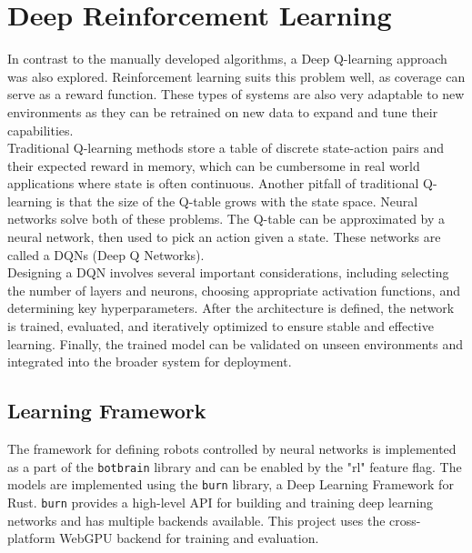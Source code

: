 
\section{Deep Reinforcement Learning}
\label{sec:rl}
In contrast to the manually developed algorithms, a Deep Q-learning approach was also explored. Reinforcement learning suits this problem well, as coverage can serve as a reward function. These types of systems are also very adaptable to new environments as they can be retrained on new data to expand and tune their capabilities. \\

Traditional Q-learning methods store a table of discrete state-action pairs and their expected reward in memory, which can be cumbersome in real world applications where state is often continuous. Another pitfall of traditional Q-learning is that the size of the Q-table grows with the state space. Neural networks solve both of these problems. The Q-table can be approximated by a neural network, then used to pick an action given a state. These networks are called a DQNs (Deep Q Networks). \\

Designing a DQN involves several important considerations, including selecting the number of layers and neurons, choosing appropriate activation functions, and determining key hyperparameters. After the architecture is defined, the network is trained, evaluated, and iteratively optimized to ensure stable and effective learning. Finally, the trained model can be validated on unseen environments and integrated into the broader system for deployment.


\subsection{Learning Framework}
The framework for defining robots controlled by neural networks is implemented as a part of the \texttt{botbrain} library and can be enabled by the "rl" feature flag. The models are implemented using the \texttt{burn} \cite{burn} library, a Deep Learning Framework for Rust. \texttt{burn} provides a high-level API for building and training deep learning networks and has multiple backends available. This project uses the cross-platform WebGPU backend \cite{wgpu} for training and evaluation. \\

